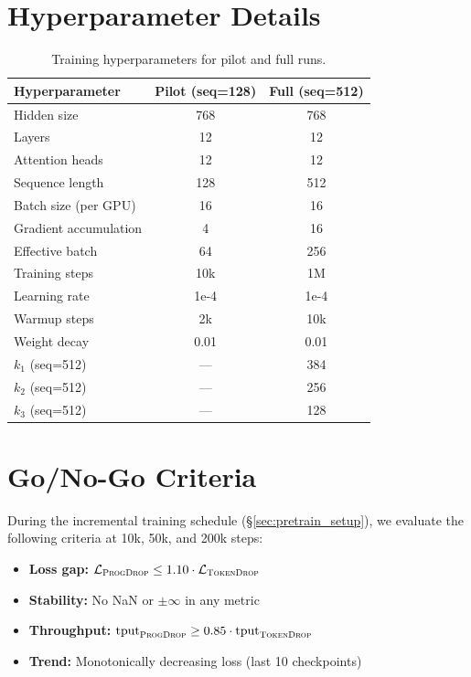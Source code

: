 \documentclass[11pt]{article}
\newcommand{\model}{\textsc{ProgDrop}}          %
\newcommand{\baseline}{\textsc{TokenDrop}}      %
\begin{document}
\appendix

\section{Hyperparameter Details}
\label{app:hypers}

\begin{table}[h]
\centering
\small
\begin{tabular}{lcc}
\toprule
\textbf{Hyperparameter} & \textbf{Pilot (seq=128)} & \textbf{Full (seq=512)} \\
\midrule
Hidden size             & 768  & 768  \\
Layers                  & 12   & 12   \\
Attention heads         & 12   & 12   \\
Sequence length         & 128  & 512  \\
Batch size (per GPU)    & 16   & 16   \\
Gradient accumulation   & 4    & 16   \\
Effective batch         & 64   & 256  \\
Training steps          & 10k  & 1M   \\
Learning rate           & 1e-4 & 1e-4 \\
Warmup steps            & 2k   & 10k  \\
Weight decay            & 0.01 & 0.01 \\
$k_1$ (seq=512)         & —    & 384  \\
$k_2$ (seq=512)         & —    & 256  \\
$k_3$ (seq=512)         & —    & 128  \\
\bottomrule
\end{tabular}
\caption{Training hyperparameters for pilot and full runs.}
\label{tab:hyperparameters}
\end{table}

\section{Go/No-Go Criteria}
\label{app:gonogo}

During the incremental training schedule (§\ref{sec:pretrain_setup}),
we evaluate the following criteria at 10k, 50k, and 200k steps:

\begin{itemize}
  \item \textbf{Loss gap:} $\mathcal{L}_{\model} \leq 1.10 \cdot \mathcal{L}_{\baseline}$
  \item \textbf{Stability:} No NaN or $\pm\infty$ in any metric
  \item \textbf{Throughput:} $\text{tput}_{\model} \geq 0.85 \cdot \text{tput}_{\baseline}$
  \item \textbf{Trend:} Monotonically decreasing loss (last 10 checkpoints)
\end{itemize}
\end{document}
